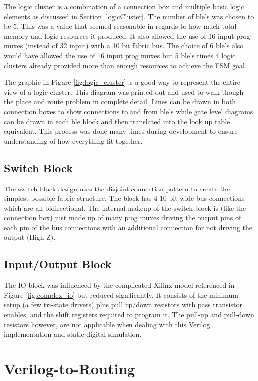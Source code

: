 \documentclass[12pt]{article}
\begin{document}
The logic cluster is a combination of a connection box and multiple basic logic elements
as discussed in Section \ref{logicCluster}. The number of ble's was chosen to be 5. This
was a value that seemed reasonable in regards to how much total memory and logic resources
 it produced. It also allowed the use of 16 input prog muxes (instead of 32 input) with a
10 bit fabric bus. The choice of 6 ble's also would have allowed the use of 16 input prog muxes but
5 ble's times 4 logic clusters already provided more than enough resources to achieve the
FSM goal.

The graphic in Figure \ref{fig:logic_cluster} is a good way to represent the entire view
of a logic cluster. This diagram was printed out and used to walk though the place and route problem in
complete detail. Lines can be drawn in both connection boxes to show connections to and from ble's while
gate level diagrams can be drawn in each ble block and then translated into the look up table
equivalent. This process was done many times during development to ensure understanding of
how everything fit together.

\subsection{Switch Block}

The switch block design uses the disjoint connection pattern to create the simplest
possible fabric structure. The block has 4 10 bit wide bus connections which are all
bidirectional. The internal makeup of the switch block is (like the connection box) just
made up of many prog muxes driving the output pins of each pin of the bus connections with
an additional connection for not driving the output (High Z).


\subsection{Input/Output Block}

The IO block was influenced by the complicated Xilinx model referenced in Figure
\ref{fig:complex_io} but reduced significantly. It consists of the minimum setup 
(a few tri-state drivers) plus pull up/down resistors with pass transistor 
enables, and the shift registers required to program it. The pull-up and pull-down
resistors however, are not applicable when dealing with this Verilog implementation
and static digital simulation.

\newpage
\section{Verilog-to-Routing}
\end{document}
